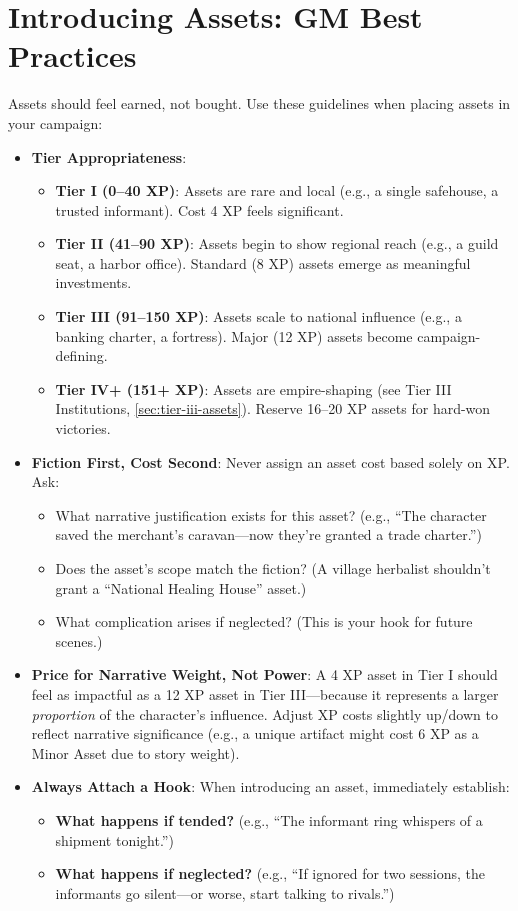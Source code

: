 \section{Introducing Assets: GM Best Practices}
Assets should feel earned, not bought. Use these guidelines when placing assets in your campaign:  
\begin{itemize}
  \item \textbf{Tier Appropriateness}:  
        \begin{itemize}
          \item \textbf{Tier I (0--40 XP)}: Assets are rare and local (e.g., a single safehouse, a trusted informant). Cost 4 XP feels significant.  
          \item \textbf{Tier II (41--90 XP)}: Assets begin to show regional reach (e.g., a guild seat, a harbor office). Standard (8 XP) assets emerge as meaningful investments.  
          \item \textbf{Tier III (91--150 XP)}: Assets scale to national influence (e.g., a banking charter, a fortress). Major (12 XP) assets become campaign-defining.  
          \item \textbf{Tier IV+ (151+ XP)}: Assets are empire-shaping (see Tier III Institutions, \ref{sec:tier-iii-assets}). Reserve 16--20 XP assets for hard-won victories.  
        \end{itemize}
  \item \textbf{Fiction First, Cost Second}: Never assign an asset cost based solely on XP. Ask:  
        \begin{itemize}
          \item What narrative justification exists for this asset? (e.g., ``The character saved the merchant's caravan---now they're granted a trade charter.'')  
          \item Does the asset's scope match the fiction? (A village herbalist shouldn't grant a ``National Healing House'' asset.)  
          \item What complication arises if neglected? (This is your hook for future scenes.)  
        \end{itemize}
  \item \textbf{Price for Narrative Weight, Not Power}: A 4 XP asset in Tier I should feel as impactful as a 12 XP asset in Tier III---because it represents a larger \textit{proportion} of the character's influence. Adjust XP costs slightly up/down to reflect narrative significance (e.g., a unique artifact might cost 6 XP as a Minor Asset due to story weight).  
  \item \textbf{Always Attach a Hook}: When introducing an asset, immediately establish:  
        \begin{itemize}
          \item \textbf{What happens if tended?} (e.g., ``The informant ring whispers of a shipment tonight.'')  
          \item \textbf{What happens if neglected?} (e.g., ``If ignored for two sessions, the informants go silent---or worse, start talking to rivals.'')  
        \end{itemize}
\end{itemize}

